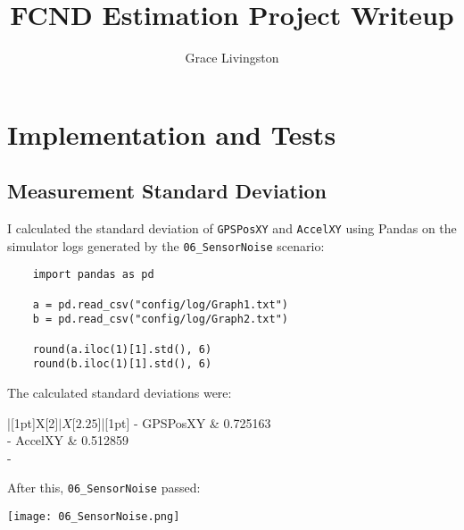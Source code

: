 \documentclass{article}
\title{FCND Estimation Project Writeup}
\author{Grace Livingston}
\begin{document}
\maketitle
\tableofcontents

\newpage

\section{Implementation and Tests}

\subsection{Measurement Standard Deviation}

I calculated the standard deviation of \texttt{GPSPosXY} and
\texttt{AccelXY} using Pandas on the simulator logs generated by the
\texttt{06\_SensorNoise} scenario:

\begin{verbatim}
    import pandas as pd

    a = pd.read_csv("config/log/Graph1.txt")
    b = pd.read_csv("config/log/Graph2.txt")

    round(a.iloc(1)[1].std(), 6)
    round(b.iloc(1)[1].std(), 6)
\end{verbatim}

The calculated standard deviations were:

\begin{footnotesize}
\begin{center}
    \begin{tabu}to 0.6\textwidth{|[1pt]X[2$]|X[2.25$]|[1pt]}
      \tabucline[1pt]-
      {GPSPosXY} & 0.725163 \\
      \tabucline-
      {AccelXY} & 0.512859 \\
      \tabucline[1pt]-
    \end{tabu}
\end{center}
\end{footnotesize}

After this, \texttt{06\_SensorNoise} passed:

\begin{center}
    \texttt{[image: 06\_SensorNoise.png]}
\end{center}
\end{document}
